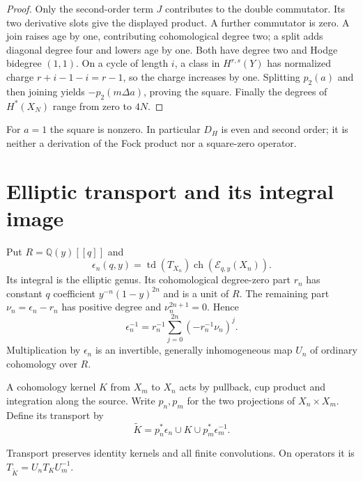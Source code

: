 \begin{proof}
Only the second-order term $J$ contributes to the double
commutator. Its two derivative slots give the displayed
product. A further commutator is zero. A join raises age
by one, contributing cohomological degree two; a split
adds diagonal degree four and lowers age by one.
Both have degree two and Hodge bidegree $(1,1)$.
On a cycle of length $i$, a class in $H^{r,s}(Y)$ has
normalized charge $r+i-1-i=r-1$, so the charge increases
by one. Splitting $p_2(a)$ and then joining yields
$-p_2(m\Delta a)$, proving the square. Finally the degrees
of $H^*(X_N)$ range from zero to $4N$.
\end{proof}

For $a=1$ the square is nonzero. In particular $D_H$
is even and second order; it is neither a
derivation of the Fock product nor a square-zero operator.

\section{Elliptic transport and its integral image}
\label{cyprim:sec:transport}

Put $R=\mathbb Q(y)[[q]]$ and
\[
 \epsilon_n(q,y)=\operatorname{td}(T_{X_n})
       \operatorname{ch}(\mathcal E_{q,y}(X_n)).
\]
Its integral is the elliptic genus. Its cohomological
degree-zero part $r_n$ has constant $q$ coefficient
$y^{-n}(1-y)^{2n}$ and is a unit of $R$.
The remaining part $\nu_n=\epsilon_n-r_n$ has positive
degree and $\nu_n^{2n+1}=0$. Hence
\begin{equation}\label{cyprim:eq:elliptic-inverse}
 \epsilon_n^{-1}=r_n^{-1}
       \sum_{j=0}^{2n}(-r_n^{-1}\nu_n)^j.
\end{equation}
Multiplication by $\epsilon_n$ is an invertible, generally
inhomogeneous map $U_n$ of ordinary cohomology over $R$.

A cohomology kernel $K$ from $X_m$ to $X_n$ acts by
pullback, cup product and integration along the source.
Write $p_n,p_m$ for the two projections of $X_n\times X_m$.
Define its transport by
\begin{equation}\label{cyprim:eq:transport}
 \widetilde K=p_n^*\epsilon_n\cup K\cup p_m^*\epsilon_m^{-1}.
\end{equation}

\begin{proposition}\label{cyprim:prop:transport}
Transport preserves identity kernels and all finite
convolutions. On operators it is
$T_{\widetilde K}=U_nT_KU_m^{-1}$.
\end{proposition}

